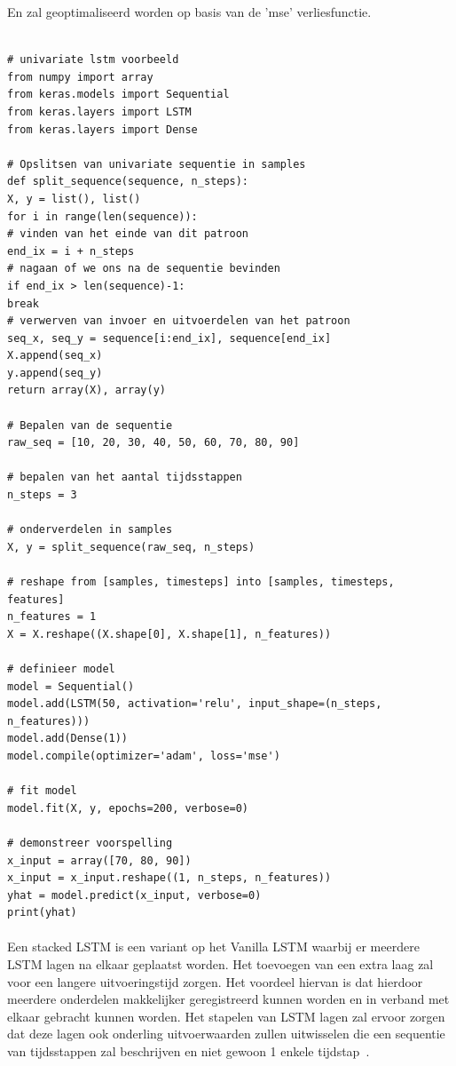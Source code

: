 En zal geoptimaliseerd worden op basis van de 'mse' verliesfunctie. 
\label{}
\begin{verbatim}

# univariate lstm voorbeeld
from numpy import array
from keras.models import Sequential
from keras.layers import LSTM
from keras.layers import Dense

# Opslitsen van univariate sequentie in samples
def split_sequence(sequence, n_steps):
X, y = list(), list()
for i in range(len(sequence)):
# vinden van het einde van dit patroon
end_ix = i + n_steps
# nagaan of we ons na de sequentie bevinden
if end_ix > len(sequence)-1:
break
# verwerven van invoer en uitvoerdelen van het patroon
seq_x, seq_y = sequence[i:end_ix], sequence[end_ix]
X.append(seq_x)
y.append(seq_y)
return array(X), array(y)

# Bepalen van de sequentie
raw_seq = [10, 20, 30, 40, 50, 60, 70, 80, 90]

# bepalen van het aantal tijdsstappen
n_steps = 3

# onderverdelen in samples
X, y = split_sequence(raw_seq, n_steps)

# reshape from [samples, timesteps] into [samples, timesteps, features]
n_features = 1
X = X.reshape((X.shape[0], X.shape[1], n_features))

# definieer model
model = Sequential()
model.add(LSTM(50, activation='relu', input_shape=(n_steps, n_features)))
model.add(Dense(1))
model.compile(optimizer='adam', loss='mse')

# fit model
model.fit(X, y, epochs=200, verbose=0)

# demonstreer voorspelling
x_input = array([70, 80, 90])
x_input = x_input.reshape((1, n_steps, n_features))
yhat = model.predict(x_input, verbose=0)
print(yhat)
\end{verbatim}

\paragraph{}

Een stacked LSTM is een variant op het Vanilla LSTM waarbij er meerdere LSTM lagen na elkaar geplaatst worden. Het toevoegen van een extra laag zal voor een langere uitvoeringstijd zorgen. Het voordeel hiervan is dat hierdoor meerdere onderdelen makkelijker geregistreerd kunnen worden en in verband met elkaar gebracht kunnen worden. Het stapelen van LSTM lagen zal ervoor zorgen dat deze lagen ook onderling uitvoerwaarden zullen uitwisselen die een sequentie van tijdsstappen zal beschrijven en niet gewoon 1 enkele tijdstap~\autocite{Brownlee2017b}.

